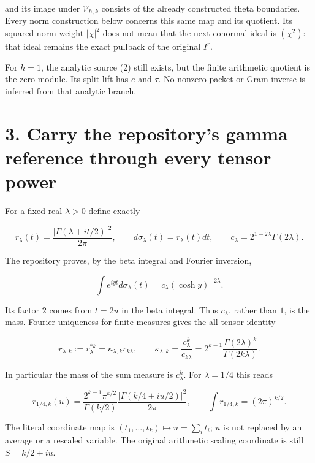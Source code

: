\documentclass[
  11pt,
]{article}
\begin{document}
and its image under \(\mathcal V_{h,k}\) consists of the already
constructed theta boundaries. Every norm construction below concerns
this same map and its quotient. Its squared-norm weight \(|\chi|^2\)
does not mean that the next conormal ideal is \((\chi^2)\): that ideal
remains the exact pullback of the original \(I^r\).

For \(h=1\), the analytic source (2) still exists, but the finite
arithmetic quotient is the zero module. Its split lift has \(e\) and
\(\tau\). No nonzero packet or Gram inverse is inferred from that
analytic branch.

\section{3. Carry the repository's gamma reference through every tensor
power}\label{carry-the-repositorys-gamma-reference-through-every-tensor-power}

For a fixed real \(\lambda>0\) define exactly

\[
r_\lambda(t)=\frac{|\Gamma(\lambda+it/2)|^2}{2\pi},\qquad
 d\sigma_\lambda(t)=r_\lambda(t)dt,\qquad
 c_\lambda=2^{1-2\lambda}\Gamma(2\lambda).                           \tag{5}
\]

The repository proves, by the beta integral and Fourier inversion,

\[
\int e^{iyt}d\sigma_\lambda(t)=c_\lambda(\cosh y)^{-2\lambda}.
                                                                    \tag{6}
\]

Its factor \(2\) comes from \(t=2u\) in the beta integral. Thus
\(c_\lambda\), rather than \(1\), is the mass. Fourier uniqueness for
finite measures gives the all-tensor identity

\[
\boxed{
 r_{\lambda,k}:=r_\lambda^{*k}
 =\kappa_{\lambda,k}r_{k\lambda},\qquad
 \kappa_{\lambda,k}=\frac{c_\lambda^k}{c_{k\lambda}}
 =2^{k-1}\frac{\Gamma(2\lambda)^k}{\Gamma(2k\lambda)}.
}                                                                   \tag{7}
\]

In particular the mass of the sum measure is \(c_\lambda^k\). For
\(\lambda=1/4\) this reads

\[
\boxed{
 r_{1/4,k}(u)=
 \frac{2^{k-1}\pi^{k/2}}{\Gamma(k/2)}
 \frac{|\Gamma(k/4+iu/2)|^2}{2\pi},\qquad
 \int r_{1/4,k}=(2\pi)^{k/2}.
}                                                                   \tag{8}
\]

The literal coordinate map is \((t_1,\ldots,t_k)\mapsto u=\sum_i t_i\);
\(u\) is not replaced by an average or a rescaled variable. The original
arithmetic scaling coordinate is still \(S=k/2+iu\).
\end{document}
